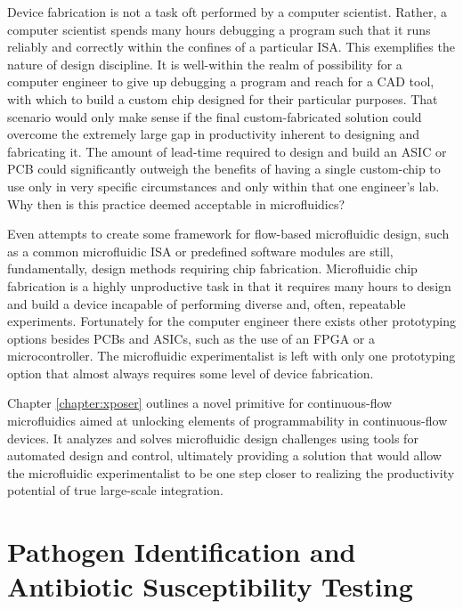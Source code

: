 Device fabrication is not a task oft performed by a computer scientist. Rather, a computer scientist spends many hours debugging a program such that it runs reliably and correctly within the confines of a particular ISA. This exemplifies the nature of design discipline. It is well-within the realm of possibility for a computer engineer to give up debugging a program and reach for a CAD tool, with which to build a custom chip designed for their particular purposes. That scenario would only make sense if the final custom-fabricated solution could overcome the extremely large gap in productivity inherent to designing and fabricating it. The amount of lead-time required to design and build an ASIC or PCB could significantly outweigh the benefits of having a single custom-chip to use only in very specific circumstances and only within that one engineer's lab. Why then is this practice deemed acceptable in microfluidics?

Even attempts to create some framework for flow-based microfluidic design, such as a common microfluidic ISA \cite{amin2009} or predefined software modules \cite{soe2013} are still, fundamentally, design methods requiring chip fabrication. Microfluidic chip fabrication is a highly unproductive task in that it requires many hours to design and build a device incapable of performing diverse and, often, repeatable experiments. Fortunately for the computer engineer there exists other prototyping options besides PCBs and ASICs, such as the use of an FPGA or a microcontroller. The microfluidic experimentalist is left with only one prototyping option that almost always requires some level of device
fabrication.

Chapter \ref{chapter:xposer} outlines a novel primitive for continuous-flow microfluidics aimed at unlocking elements of programmability in continuous-flow devices. It analyzes and solves microfluidic design challenges using tools for automated design and control, ultimately providing a solution that would allow the microfluidic experimentalist to be one step closer to realizing the productivity potential of true large-scale integration. 


\section{Pathogen Identification and Antibiotic Susceptibility Testing}
\label{sec:cellSep}


